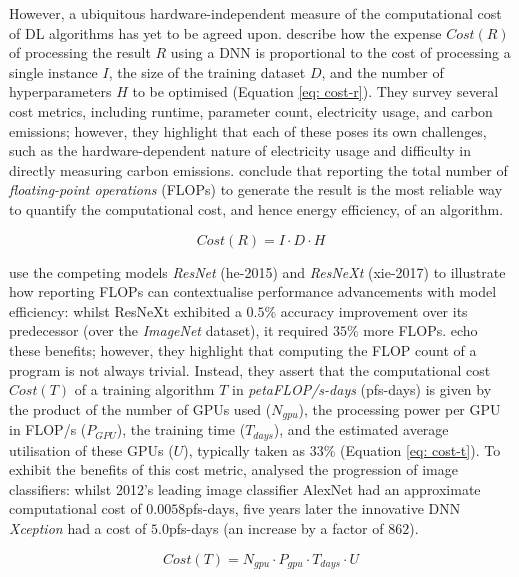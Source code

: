 \documentclass[a4paper, 11pt]{report}
\begin{document}
    However, a ubiquitous hardware-independent measure of the computational cost of DL algorithms has yet to be agreed upon. \citet{schwartz-2019} describe how the expense $Cost(R)$ of processing the result $R$ using a DNN is proportional to the cost of processing a single instance $I$, the size of the training dataset $D$, and the number of hyperparameters $H$ to be optimised (Equation \ref{eq: cost-r}). They survey several cost metrics, including runtime, parameter count, electricity usage, and carbon emissions; however, they highlight that each of these poses its own challenges, such as the hardware-dependent nature of electricity usage and difficulty in directly measuring carbon emissions. \citet{schwartz-2019} conclude that reporting the total number of \emph{floating-point operations} (FLOPs) to generate the result is the most reliable way to quantify the computational cost, and hence energy efficiency, of an algorithm.

    \begin{equation}
        \label{eq: cost-r}
        Cost(R) = I \cdot D \cdot H
    \end{equation}

    \citet{schwartz-2019} use the competing models \emph{ResNet} (he-2015) and \emph{ResNeXt} (xie-2017) to illustrate how reporting FLOPs can contextualise performance advancements with model efficiency: whilst ResNeXt exhibited a $0.5\%$ accuracy improvement over its predecessor (over the \emph{ImageNet} dataset), it required $35\%$ more FLOPs. \citet{amodei-2018} echo these benefits; however, they highlight that computing the FLOP count of a program is not always trivial. Instead, they assert that the computational cost $Cost(T)$ of a training algorithm $T$ in \emph{petaFLOP/s-days} (pfs-days) is given by the product of the number of GPUs used ($N_{gpu}$), the processing power per GPU in FLOP/s ($P_{GPU}$), the training time ($T_{days}$), and the estimated average utilisation of these GPUs ($U$), typically taken as $33\%$ (Equation \ref{eq: cost-t}). To exhibit the benefits of this cost metric, \citet{amodei-2018} analysed the progression of image classifiers: whilst 2012's leading image classifier AlexNet \citep{krizhevsky-2012} had an approximate computational cost of $0.0058$pfs-days, five years later the innovative DNN \emph{Xception} \citep{chollet-2017} had a cost of $5.0$pfs-days (an increase by a factor of $862$).

    \begin{equation}
        \label{eq: cost-t}
        Cost(T) = N_{gpu} \cdot P_{gpu} \cdot T_{days} \cdot U
    \end{equation}
\end{document}
